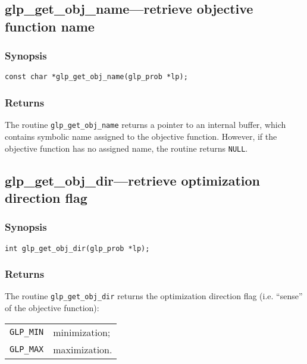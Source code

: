 \subsection{glp\_get\_obj\_name---retrieve objective function name}

\subsubsection*{Synopsis}

\begin{verbatim}
const char *glp_get_obj_name(glp_prob *lp);
\end{verbatim}

\subsubsection*{Returns}

The routine \verb|glp_get_obj_name| returns a pointer to an internal
buffer, which contains symbolic name assigned to the objective
function. However, if the objective function has no assigned name, the
routine returns \verb|NULL|.

\subsection{glp\_get\_obj\_dir---retrieve optimization direction flag}

\subsubsection*{Synopsis}

\begin{verbatim}
int glp_get_obj_dir(glp_prob *lp);
\end{verbatim}

\subsubsection*{Returns}

The routine \verb|glp_get_obj_dir| returns the optimization direction
flag (i.e. ``sense'' of the objective function):

\begin{tabular}{@{}ll}
\verb|GLP_MIN| & minimization; \\
\verb|GLP_MAX| & maximization. \\
\end{tabular}

\pagebreak

